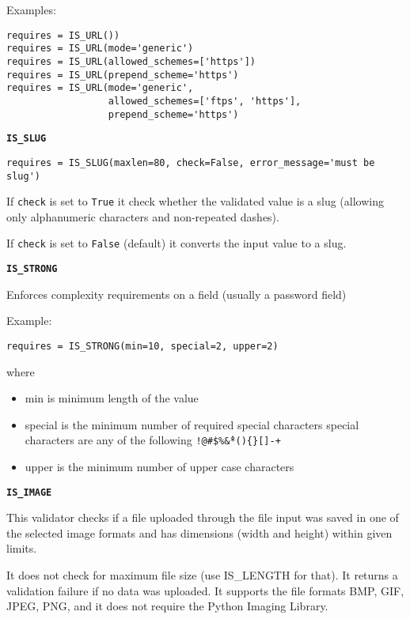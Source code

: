 \documentclass[justified,sixbynine,notoc]{tufte-book}
\def\ft{\small\tt}
\def\inxx#1{\index{#1}}
\begin{document}
\begin{fullwidth}
Examples:
\begin{lstlisting}
requires = IS_URL())
requires = IS_URL(mode='generic')
requires = IS_URL(allowed_schemes=['https'])
requires = IS_URL(prepend_scheme='https')
requires = IS_URL(mode='generic',
                  allowed_schemes=['ftps', 'https'],
                  prepend_scheme='https')
\end{lstlisting}

{\bf {\ft IS\_SLUG}}

\inxx{IS\_SLUG}
\begin{lstlisting}
requires = IS_SLUG(maxlen=80, check=False, error_message='must be slug')
\end{lstlisting}

If {\ft check} is set to {\ft True} it check whether the validated value is a slug (allowing only alphanumeric characters and non-repeated dashes).

If {\ft check} is set to {\ft False} (default) it converts the input value to a slug.

{\bf {\ft IS\_STRONG}}

\inxx{IS\_STRONG}

Enforces complexity requirements on a field (usually a password field)

Example:
\begin{lstlisting}
requires = IS_STRONG(min=10, special=2, upper=2)
\end{lstlisting}
\noindent where
\begin{itemize}
\item min is minimum length of the value

\item special is the minimum number of required special characters special characters are any of the following {\ft !@\#\$\%\^\&*()\{\}[]-+}

\item upper is the minimum number of upper case characters
\end{itemize}

{\bf {\ft IS\_IMAGE}}

\inxx{IS\_IMAGE}

This validator checks if a file uploaded through the file input was saved in one of the selected image formats and has dimensions (width and height) within given limits.

It does not check for maximum file size (use IS\_LENGTH for that). It returns
a validation failure if no data was uploaded. It supports the file formats BMP, GIF, JPEG, PNG, and it does not require the Python Imaging Library.


\end{fullwidth}
\end{document}
